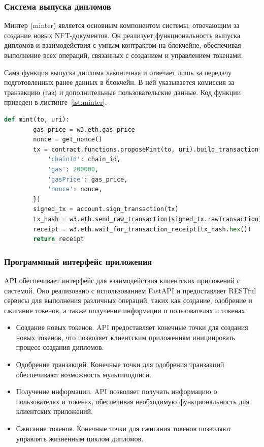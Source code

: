 \subsubsection{Система выпуска дипломов}

Минтер (minter) является основным компонентом системы, отвечающим за создание новых NFT-документов. Он реализует функциональность выпуска дипломов и взаимодействия с умным контрактом на блокчейне, обеспечивая выполнение всех операций, связанных с созданием и управлением токенами.

Сама функция выпуска диплома лаконичная и отвечает лишь за передачу подготовленных ранее данных в блокчейн. В ней указывается комиссия за транзакцию (газ) и дополнительные пользовательские данные. Код функции приведен в листинге~\ref{lst:minter}.

\begin{lstlisting}[label=lst:minter, language=Python, caption=Функция выпуска диплома]
    def mint(to, uri):
        gas_price = w3.eth.gas_price
        nonce = get_nonce()
        tx = contract.functions.proposeMint(to, uri).build_transaction({
            'chainId': chain_id,
            'gas': 200000,
            'gasPrice': gas_price,
            'nonce': nonce,
        })
        signed_tx = account.sign_transaction(tx)
        tx_hash = w3.eth.send_raw_transaction(signed_tx.rawTransaction)
        receipt = w3.eth.wait_for_transaction_receipt(tx_hash.hex())
        return receipt
\end{lstlisting}

\subsubsection{Программный интерфейс приложения}

API обеспечивает интерфейс для взаимодействия клиентских приложений с системой. Оно реализовано с использованием FastAPI и предоставляет RESTful сервисы для выполнения различных операций, таких как создание, одобрение и сжигание токенов, а также получение информации о пользователях и токенах.

\begin{itemize}
    \item Создание новых токенов. API предоставляет конечные точки для создания новых токенов, что позволяет клиентским приложениям инициировать процесс создания дипломов.
    \item Одобрение транзакций. Конечные точки для одобрения транзакций обеспечивают возможность мультиподписи.
    \item Получение информации. API позволяет получать информацию о пользователях и токенах, обеспечивая необходимую функциональность для клиентских приложений.
    \item Сжигание токенов. Конечные точки для сжигания токенов позволяют управлять жизненным циклом дипломов.
\end{itemize}

